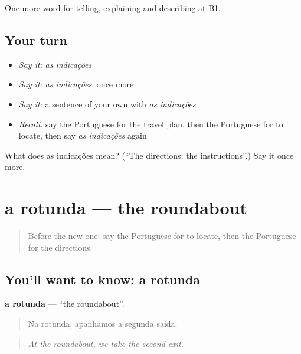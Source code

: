 \begin{grammarlens}[title={What you've built}]
One more word for telling, explaining and describing at B1.
\end{grammarlens}

\subsection*{Your turn}
\begin{itemize}
\raggedright
  \item \emph{Say it:} \emph{as indicações}
  \item \emph{Say it:} \emph{as indicações}, once more
  \item \emph{Say it:} a sentence of your own with \emph{as indicações}
  \item \emph{Recall:} say the Portuguese for the travel plan, then the Portuguese for to locate, then say \emph{as indicações} again
\end{itemize}

\begin{tcolorbox}[breakable,colback=teal!4,colframe=teal!35!black,title={Before you move on}]
What does as indicações mean? (\textquotedblleft{}The directions; the instructions\textquotedblright{}.) Say it once more.
\end{tcolorbox}
\section[a rotunda]{a rotunda — the roundabout}

\label{lesson:PT-C436-rotunda}



\begin{quote}
Before the new one: say the Portuguese for to locate, then the Portuguese for the directions.
\end{quote}

\subsection*{You'll want to know: a rotunda}
\textbf{a rotunda} — \textquotedblleft{}the roundabout\textquotedblright{}.

\begin{quote}
Na rotunda, apanhamos a segunda saída.
\end{quote}

\begin{quote}
\emph{At the roundabout, we take the second exit.}
\end{quote}

